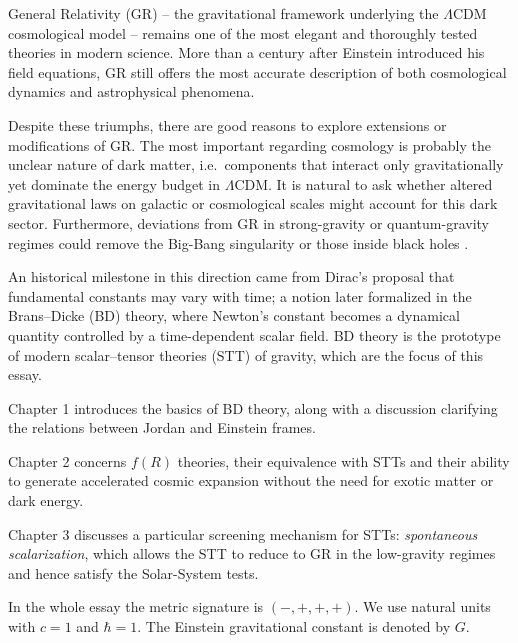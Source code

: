 General Relativity (GR) -- the gravitational framework underlying the $\Lambda$CDM cosmological model -- remains one of the most elegant and thoroughly tested theories in modern science. More than a century after Einstein introduced his field equations, GR still offers the most accurate description of both cosmological dynamics and astrophysical phenomena. 

Despite these triumphs, there are good reasons to explore extensions or modifications of GR. The most important regarding cosmology is probably the unclear nature of dark matter, i.e.\ components that interact only gravitationally yet dominate the energy budget in $\Lambda$CDM. It is natural to ask whether altered gravitational laws on galactic or cosmological scales might account for this dark sector. 
Furthermore, deviations from GR in strong-gravity or quantum-gravity regimes could remove the Big-Bang singularity or those inside black holes \cite{Braglia:2021axy}.

An historical milestone in this direction came from Dirac’s proposal that fundamental constants may vary with time; a notion later formalized in the Brans–Dicke (BD) theory, where Newton’s constant becomes a dynamical quantity controlled by a time-dependent scalar field. BD theory is the prototype of modern scalar–tensor theories (STT) of gravity, which are the focus of this essay.

Chapter 1 introduces the basics of BD theory, along with a discussion clarifying the relations between Jordan and Einstein frames.

Chapter 2 concerns $f(R)$ theories, their equivalence with STTs and their ability to generate accelerated cosmic expansion without the need for exotic matter or dark energy. 

Chapter 3 discusses a particular screening mechanism for STTs: \textit{spontaneous scalarization}, which allows the STT to reduce to GR in the low-gravity regimes and hence satisfy the Solar-System tests.

In the whole essay the metric signature is $(-,+,+,+)$. We use natural units with $c=1$ and $\hbar=1$. The Einstein gravitational constant is denoted by $G$.
